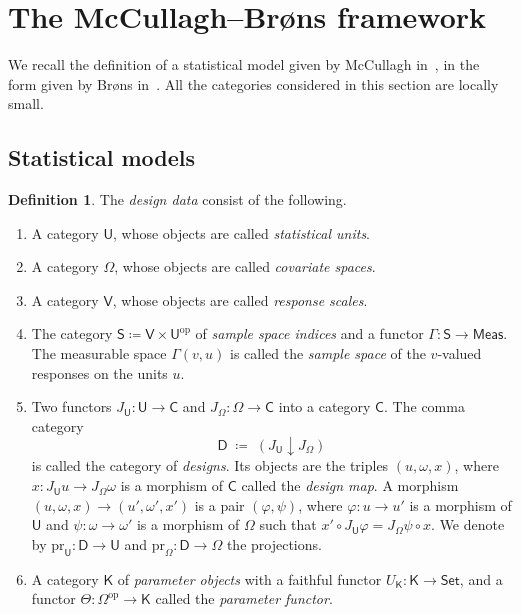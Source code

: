 \documentclass[11pt,a4paper]{article}
\theoremstyle{plain}
\theoremstyle{definition}
\newtheorem{definition}[theorem]{Definition}
\theoremstyle{remark}
\newcommand{\cat}[1]{\mathsf{#1}}
\newcommand{\catU}{\cat{U}}
\newcommand{\catV}{\cat{V}}
\newcommand{\catO}{\cat{\Omega}}
\newcommand{\catS}{\cat{S}}
\newcommand{\catD}{\cat{D}}
\newcommand{\catK}{\cat{K}}
\newcommand{\Meas}{\cat{Meas}}
\newcommand{\Set}{\cat{Set}}
\newcommand{\op}{\mathrm{op}}
\newcommand{\pr}{\mathrm{pr}}
\begin{document}
\section{The McCullagh--Br\o ns framework}\label{sec:mcb}

We recall the definition of a statistical model given by McCullagh
in~\cite{mccullagh_what_2002}, in the form given by Br\o ns
in~\cite{brons_discussion_2002}. All the categories considered in this section
are locally small.

\subsection{Statistical models}

\begin{definition}\label{def:designdata}
The \emph{design data} consist of the following.
\begin{enumerate}
\item A category $\catU$, whose objects are called \emph{statistical units}.
\item A category $\catO$, whose objects are called \emph{covariate spaces}.
\item A category $\catV$, whose objects are called \emph{response scales}.
\item The category $\catS \coloneqq \catV \times \catU^{\op}$ of \emph{sample
space indices} and a functor $\Gamma \colon \catS \to \Meas$. The measurable
space $\Gamma(v,u)$ is called the \emph{sample space} of the $v$-valued
responses on the units $u$.
\item Two functors $J_{\catU} \colon \catU \to \cat{C}$ and
$J_{\catO} \colon \catO \to \cat{C}$ into a category $\cat{C}$. The comma
category
\[
\catD \;\coloneqq\; (J_{\catU} \downarrow J_{\catO})
\]
is called the category of \emph{designs}. Its objects are the triples
$(u,\omega,x)$, where $x \colon J_\catU u \to J_\catO \omega$ is a morphism of
$\cat{C}$ called the \emph{design map}. A morphism
$(u,\omega,x) \to (u',\omega',x')$ is a pair $(\varphi,\psi)$, where
$\varphi \colon u \to u'$ is a morphism of $\catU$ and
$\psi \colon \omega \to \omega'$ is a morphism of $\catO$ such that
$x' \circ J_{\catU}\varphi = J_{\catO}\psi \circ x$. We denote by
$\pr_{\catU} \colon \catD \to \catU$ and $\pr_{\catO} \colon \catD \to \catO$
the projections.
\item A category $\catK$ of \emph{parameter objects} with a faithful functor
$U_{\catK} \colon \catK \to \Set$, and a functor
$\Theta \colon \catO^{\op} \to \catK$ called the \emph{parameter functor}.
\end{enumerate}
\end{definition}
\end{document}
